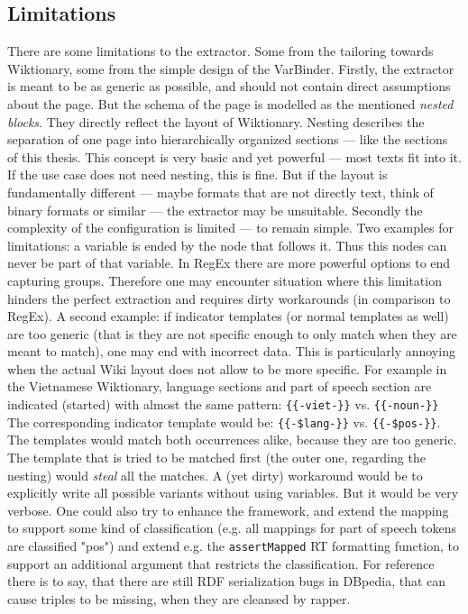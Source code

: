 \subsection{Limitations}
There are some limitations to the extractor. Some from the tailoring towards Wiktionary, some from the simple design of the VarBinder. Firstly, the extractor is meant to be as  generic as possible, and should not contain direct assumptions about the page. But the schema of the page is modelled as the mentioned \textit{nested blocks}. They directly reflect the layout of Wiktionary. Nesting describes the separation of one page into hierarchically organized sections --- like the sections of this thesis. This concept is very basic and yet powerful --- most texts fit into it. If the use case does not need nesting, this is fine. But if the layout is fundamentally different --- maybe formats that are not directly text, think of binary formats or similar --- the extractor may be unsuitable. Secondly the complexity of the configuration is limited --- to remain simple. Two examples for limitations: a variable is ended by the node that follows it. Thus this nodes can never be part of that variable. In RegEx there are more powerful options to end capturing groups. Therefore one may encounter situation where this limitation hinders the perfect extraction and requires dirty workarounds (in comparison to RegEx). A second example: if indicator templates (or normal templates as well) are too generic (that is they are not specific enough to only match when they are meant to match), one may end with incorrect data. This is particularly annoying when the actual Wiki layout does not allow to be more specific. For example in the Vietnamese Wiktionary, language sections and part of speech section are indicated (started) with almost the same pattern: \verb+{{-viet-}}+ vs.
\verb+{{-noun-}}+
The corresponding indicator template would be: \verb+{{-$lang-}}+ vs. \verb+{{-$pos-}}+. The templates would match both occurrences alike, because they are too generic. The template that is tried to be matched first (the outer one, regarding the nesting) would \textit{steal} all the matches. A (yet dirty) workaround would be to explicitly write all possible variants without using variables. But it would be very verbose. One could also try to enhance the framework, and extend the mapping to support some kind of classification (e.g. all mappings for part of speech tokens are classified "pos") and extend e.g. the \texttt{assertMapped} RT formatting function, to support an additional argument that restricts the classification.
For reference there is to say, that there are still RDF serialization bugs in DBpedia, that can cause triples to be missing, when they are cleansed by rapper.


\newpage

